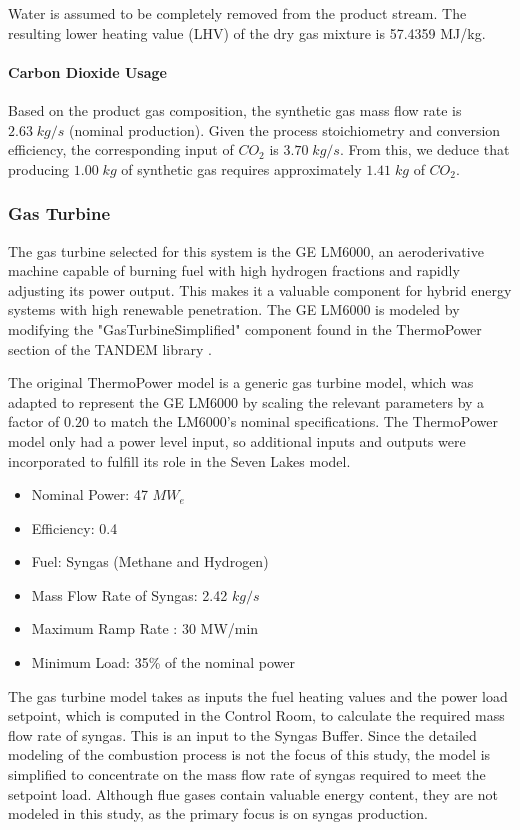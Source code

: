 Water is assumed to be completely removed from the product stream. The resulting lower heating value (LHV) of the dry gas mixture is 57.4359 MJ/kg.

\paragraph{Carbon Dioxide Usage}
Based on the product gas composition, the synthetic gas mass flow rate is $2.63 \; kg/s$ (nominal production). Given the process stoichiometry and conversion efficiency, the corresponding input of $CO_2$ is $3.70 \; kg/s$. From this, we deduce that producing $1.00 \; kg$ of synthetic gas requires approximately $1.41 \; kg$ of $CO_2$.

\subsubsection{Gas Turbine}
The gas turbine selected for this system is the GE LM6000, an aeroderivative machine capable of burning fuel with high hydrogen fractions and rapidly adjusting its power output. This makes it a valuable component for hybrid energy systems with high renewable penetration. The GE LM6000 is modeled by modifying the "GasTurbineSimplified" component found in the ThermoPower section of the TANDEM library \cite{TANDEM}.

The original ThermoPower model is a generic gas turbine model, which was adapted to represent the GE LM6000 by scaling the relevant parameters by a factor of $0.20$ to match the LM6000's nominal specifications. The ThermoPower model only had a power level input, so additional inputs and outputs were incorporated to fulfill its role in the Seven Lakes model.

\begin{tcolorbox}[boxstyle, title=GE LM6000 specifics]
  \begin{itemize}
    \item Nominal Power: 47 $MW_e$
    \item Efficiency: 0.4
    \item Fuel: Syngas (Methane and Hydrogen)
    \item Mass Flow Rate of Syngas: 2.42 $kg/s$
    \item Maximum Ramp Rate : 30 MW/min
    \item Minimum Load: 35\% of the nominal power
  \end{itemize}
\end{tcolorbox}

The gas turbine model takes as inputs the fuel heating values and the power load setpoint, which is computed in the Control Room, to calculate the required mass flow rate of syngas. This is an input to the Syngas Buffer. Since the detailed modeling of the combustion process is not the focus of this study, the model is simplified to concentrate on the mass flow rate of syngas required to meet the setpoint load. Although flue gases contain valuable energy content, they are not modeled in this study, as the primary focus is on syngas production.

